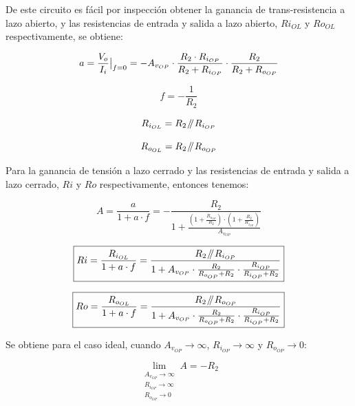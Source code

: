 De este circuito es fácil por inspección obtener la ganancia de trans-resistencia a lazo abierto,  y las resistencias de entrada y salida a lazo abierto, $R{i_{OL}}$ y $R{o_{OL}}$ respectivamente, se obtiene:


\begin{equation}
a =  \evalat{\frac{V_{o}}{I_{i}}}{f=0} = -A_{v_{OP}} \cdot \frac{ R_{2} \cdot R_{i_{OP}} }{ R_{2} + R_{i_{OP}} } \cdot \frac{ R_{2}  }{ R_{2} + R_{o_{OP}} }
\end{equation}

\begin{equation}
f =  -\frac{1}{R_{2}}
\end{equation}

\begin{equation}
R_{i_{OL}} = R_{2} \mathbin{\!/\mkern-5mu/\!} R_{i_{OP}}
\end{equation}

\begin{equation}
R_{o_{OL}} = R_{2} \mathbin{\!/\mkern-5mu/\!} R_{o_{OP}}
\end{equation}

Para la ganancia de tensión a lazo cerrado y las resistencias de entrada y salida a lazo cerrado, $R{i}$ y $R{o}$ respectivamente, entonces tenemos:


\begin{equation}
\boxed{   A = \frac{a}{1 + a \cdot f} =  -\frac{ R_{2} }{ 1 + \frac{ \left( 1 + \frac{R_{o_{OP}}}{R_{2}} \right) \cdot \left( 1 + \frac{R_{2}}{R_{i_{OP}}} \right)  }{ A_{v_{OP}}  }  }    }
\end{equation}

\begin{equation}
\boxed{ R{i} = \frac{R_{i_{OL}}}{1 + a \cdot f} =  \frac{ R_{2} \mathbin{\!/\mkern-5mu/\!} R_{i_{OP}}  }{ 1 + A_{v_{OP}} \cdot \frac{R_{2}}{R_{o_{OP}} + R_{2}} \cdot \frac{R_{i_{OP}}}{R_{i_{OP}} + R_{2}}  }   }
\end{equation}


\begin{equation}
\boxed{ R{o} = \frac{R_{o_{OL}}}{1 + a \cdot f} = \frac{ R_{2} \mathbin{\!/\mkern-5mu/\!} R_{o_{OP}}  }{ 1 + A_{v_{OP}} \cdot \frac{R_{2}}{R_{o_{OP}} + R_{2}} \cdot \frac{R_{i_{OP}}}{R_{i_{OP}} + R_{2}}  }  }
\end{equation}


Se obtiene para el caso ideal, cuando $A_{v_{OP}} \longrightarrow \infty$, $R_{i_{OP}} \longrightarrow \infty$ y $R_{o_{OP}} \longrightarrow 0$:

\begin{equation}
\lim_{\substack{A_{v_{OP}} \to \infty \\ R_{i_{OP}} \to \infty \\ R_{o_{OP}} \to 0}} A = -R_{2} 
\end{equation}


